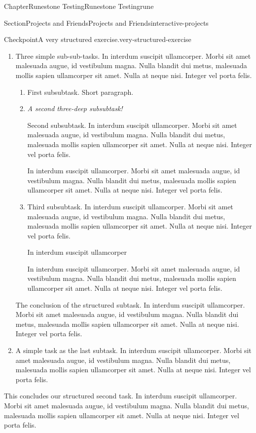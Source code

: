 \documentclass[oneside,10pt,]{book}
\newcommand{\lititle}[1]{{\slshape#1}}
\numberwithin{equation}{section}
\begin{document}
\begin{chapterptx}{Chapter}{Runestone Testing}{}{Runestone Testing}{}{}{rune}
\begin{sectionptx}{Section}{Projects and Friends}{}{Projects and Friends}{}{}{interactive-projects}
\begin{inlineexercise}{Checkpoint}{A very structured exercise.}{very-structured-exercise}
\begin{enumerate}[font=\bfseries,label=(\alph*),ref=\alph*]
\begin{enumerate}[font=\bfseries,label=(\roman*),ref=\theenumi.\roman*]
\item{}Three simple sub-sub-tasks.  In interdum suscipit ullamcorper. Morbi sit amet malesuada augue, id vestibulum magna. Nulla blandit dui metus, malesuada mollis sapien ullamcorper sit amet. Nulla at neque nisi. Integer vel porta felis.%
\begin{enumerate}[font=\bfseries,label=(\Alph*),ref=\theenumi.\theenumii.\Alph*]%
\item{}First subsubtask.  Short paragraph.%
\item{}\lititle{A second three-deep subsubtask!}\par%
Second subsubtask.  In interdum suscipit ullamcorper. Morbi sit amet malesuada augue, id vestibulum magna. Nulla blandit dui metus, malesuada mollis sapien ullamcorper sit amet. Nulla at neque nisi. Integer vel porta felis.%
\par
In interdum suscipit ullamcorper. Morbi sit amet malesuada augue, id vestibulum magna. Nulla blandit dui metus, malesuada mollis sapien ullamcorper sit amet. Nulla at neque nisi. Integer vel porta felis.%
\item{}Third subsubtask.  In interdum suscipit ullamcorper. Morbi sit amet malesuada augue, id vestibulum magna. Nulla blandit dui metus, malesuada mollis sapien ullamcorper sit amet. Nulla at neque nisi. Integer vel porta felis.%
\par
In interdum suscipit ullamcorper%
\par
In interdum suscipit ullamcorper. Morbi sit amet malesuada augue, id vestibulum magna. Nulla blandit dui metus, malesuada mollis sapien ullamcorper sit amet. Nulla at neque nisi. Integer vel porta felis.%
\end{enumerate}%
The conclusion of the structured subtask.  In interdum suscipit ullamcorper. Morbi sit amet malesuada augue, id vestibulum magna. Nulla blandit dui metus, malesuada mollis sapien ullamcorper sit amet. Nulla at neque nisi. Integer vel porta felis.%
\item{}A simple task as the last subtask.  In interdum suscipit ullamcorper. Morbi sit amet malesuada augue, id vestibulum magna. Nulla blandit dui metus, malesuada mollis sapien ullamcorper sit amet. Nulla at neque nisi. Integer vel porta felis.%
\end{enumerate}%
This concludes our structured second task.  In interdum suscipit ullamcorper. Morbi sit amet malesuada augue, id vestibulum magna. Nulla blandit dui metus, malesuada mollis sapien ullamcorper sit amet. Nulla at neque nisi. Integer vel porta felis.%

\end{enumerate}
\end{inlineexercise}
\end{sectionptx}
\end{chapterptx}
\end{document}
